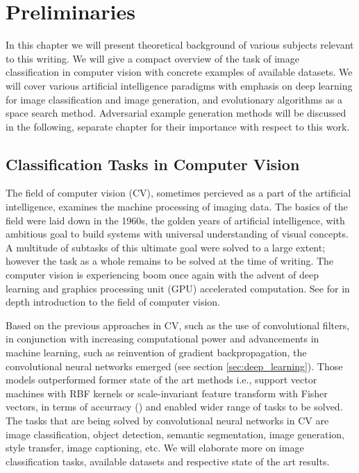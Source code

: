 \chapter{Preliminaries}
In this chapter we will present theoretical background of various subjects relevant to this writing. We will give a compact overview of the task of image classification in computer vision with concrete examples of available datasets. We will cover various artificial intelligence paradigms with emphasis on deep learning for image classification and image generation, and evolutionary algorithms as a space search method. Adversarial example generation methods will be discussed in the following, separate chapter for their importance with respect to this work.

\section{Classification Tasks in Computer Vision}
The field of computer vision (CV), sometimes percieved as a part of the artificial intelligence, examines the machine processing of imaging data. The basics of the field were laid down in the 1960s, the golden years of artificial intelligence, with ambitious goal to build systems with universal understanding of visual concepts. A multitude of subtasks of this ultimate goal were solved to a large extent; however the task as a whole remains to be solved at the time of writing. The computer vision is experiencing boom once again with the advent of deep learning and graphics processing unit (GPU) accelerated computation. See \cite{computer_vision} for in depth introduction to the field of computer vision.

Based on the previous approaches in CV, such as the use of convolutional filters, in conjunction with increasing computational power and advancements in machine learning, such as reinvention of gradient backpropagation, the convolutional neural networks emerged (see section \ref{sec:deep_learning}). Those models outperformed former state of the art methods i.e., support vector machines with RBF kernels or scale-invariant feature transform with Fisher vectors, in terms of accurracy (\cite{NIPS2012_4824}) and enabled wider range of tasks to be solved. The tasks that are being solved by convolutional neural networks in CV are image classification, object detection, semantic segmentation, image generation, style transfer, image captioning, etc. We will elaborate more on image classification tasks, available datasets and respective state of the art results.

